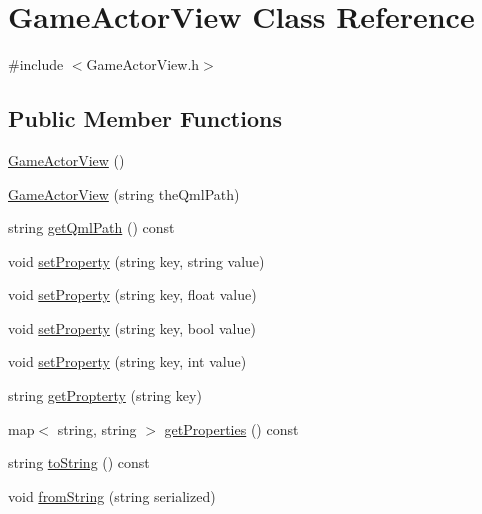 \hypertarget{class_game_actor_view}{\section{Game\+Actor\+View Class Reference}
\label{class_game_actor_view}
}


{\ttfamily \#include $<$Game\+Actor\+View.\+h$>$}

\subsection*{Public Member Functions}
\begin{DoxyCompactItemize}
\item 
\hyperlink{class_game_actor_view_ac364ad4b8b84afeb3646afb2c9595315}{Game\+Actor\+View} ()
\item 
\hyperlink{class_game_actor_view_a701bf0bc7aa6ef90cd96afbcdca731da}{Game\+Actor\+View} (string the\+Qml\+Path)
\item 
string \hyperlink{class_game_actor_view_a5a796c75c6205f0f7874a3bce97cfba8}{get\+Qml\+Path} () const 
\item 
void \hyperlink{class_game_actor_view_a89d3c6c159128714e6780c4fda51fdcd}{set\+Property} (string key, string value)
\item 
void \hyperlink{class_game_actor_view_aa1911219122fef24d4953b9aebdfba21}{set\+Property} (string key, float value)
\item 
void \hyperlink{class_game_actor_view_ae7a1149056fffae502fa92b7a83ed026}{set\+Property} (string key, bool value)
\item 
void \hyperlink{class_game_actor_view_aa783426287a1ec0f3fd54aeffbcc9407}{set\+Property} (string key, int value)
\item 
string \hyperlink{class_game_actor_view_a36c37691a940aa339beb5aebec818933}{get\+Propterty} (string key)
\item 
map$<$ string, string $>$ \hyperlink{class_game_actor_view_a1c08b8b6229640a6312e088bf173c2a8}{get\+Properties} () const 
\item 
string \hyperlink{class_game_actor_view_a7aacc01fec85433fcefd43663b48a763}{to\+String} () const 
\item 
void \hyperlink{class_game_actor_view_a36cb82690cbaf53296a1b24d32a36140}{from\+String} (string serialized)
\end{DoxyCompactItemize}


